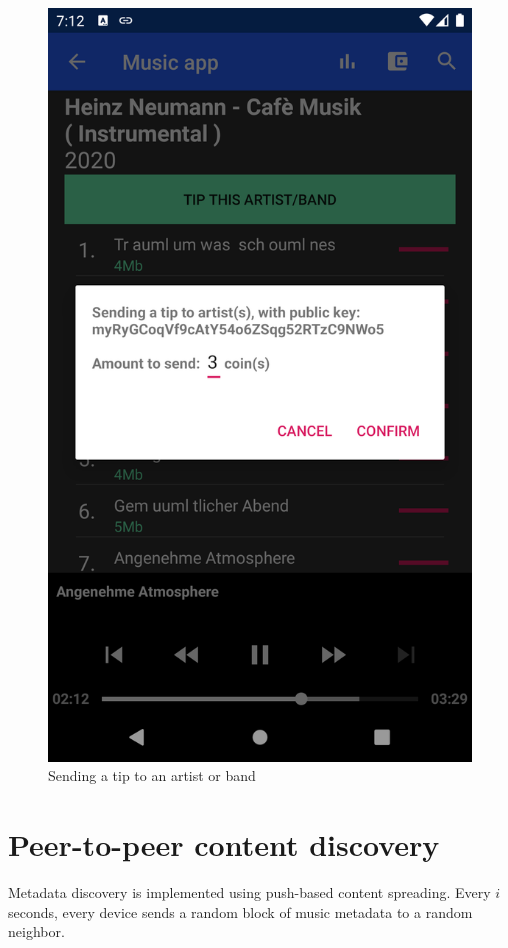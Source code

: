 \begin{figure}[]
        \includegraphics[width=1\linewidth]{implementation/send-tip}
        \caption{Sending a tip to an artist or band}
        \label{fig:tip-artist}
    \endminipage
\end{figure}

\section{Peer-to-peer content discovery}
Metadata discovery is implemented using push-based content spreading. Every $i$ seconds, every device sends a random block of music metadata to a random neighbor. 


